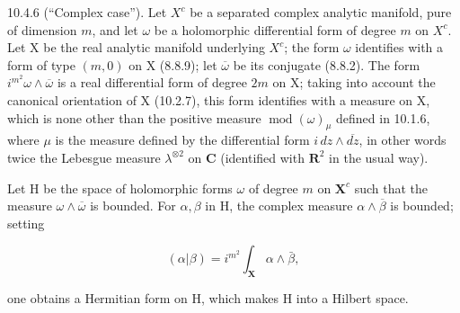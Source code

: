 10.4.6 (“Complex case”). Let \(X^{c}\) be a separated complex analytic manifold, pure of dimension \(m\), and let \(\omega\) be a holomorphic differential form of degree \(m\) on \(X^{c}\). Let X be the real analytic manifold underlying \(X^{c}\); the form \(\omega\) identifies with a form of type \((m,0)\) on X (8.8.9); let \(\overline{\omega}\) be its conjugate (8.8.2). The form \(i^{m^{2}}\omega \wedge \overline{\omega}\) is a real differential form of degree \(2m\) on X; taking into account the canonical orientation of X (10.2.7), this form identifies with a measure on X, which is none other than the positive measure \(\operatorname{mod}(\omega)_{\mu}\) defined in 10.1.6, where \(\mu\) is the measure defined by the differential form \(i \, dz \wedge \overline{dz}\), in other words twice the Lebesgue measure \(\lambda^{\otimes 2}\) on \(\mathbf{C}\) (identified with \(\mathbf{R}^{2}\) in the usual way).

Let H be the space of holomorphic forms \(\omega\) of degree \(m\) on \(\mathbf{X}^c\) such that the measure \(\omega \wedge \overline{\omega}\) is bounded. For \(\alpha, \beta\) in H, the complex measure \(\alpha \wedge \overline{\beta}\) is bounded; setting

\[
(\alpha | \beta) = i ^ {m ^ {2}} \int_ {\mathbf {X}} \alpha \wedge \bar {\beta},
\]

one obtains a Hermitian form on H, which makes H into a Hilbert space.

